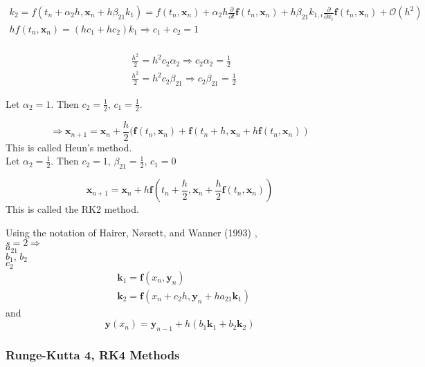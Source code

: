 \documentclass[10pt]{amsart}
\begin{document}
\begin{multicols*}{2}
\[
\begin{gathered}
k_2 = f(t_n+\alpha_2 h, \mathbf{x}_n + h\beta_{21} k_1) = f(t_n,\mathbf{x}_n) + \alpha_2 h \frac{\partial}{\partial t} \mathbf{f}(t_n,\mathbf{x}_n) + h \beta_{21} k_{1, i} \frac{\partial}{\partial x_i} \mathbf{f}(t_n, \mathbf{x}_n) + \mathcal{O}(h^2)	 \\
hf(t_n,\mathbf{x}_n) = (hc_1 + hc_2) k_1 \Longrightarrow c_1 + c_2 = 1 \\
\end{gathered}
\]

\[
\begin{aligned}
	& \frac{h^2}{2} = h^2 c_2 \alpha_2 \Longrightarrow c_2\alpha_2 = \frac{1}{2} \\
 	& \frac{h^2}{2} = h^2 c_2 \beta_{21} \Longrightarrow c_2 \beta_{21} = \frac{1}{2}
\end{aligned}
\]

Let $\alpha_2 = 1$. Then $c_2 = \frac{1}{2}$, $c_1= \frac{1}{2}$.

\[
\Longrightarrow \mathbf{x}_{n+1} = \mathbf{x}_n + \frac{h}{2} (\mathbf{f}(t_n, \mathbf{x}_n ) + \mathbf{f}(t_n + h, \mathbf{x}_n + h\mathbf{f}(t_n, \mathbf{x}_n))
\]
This is called Heun's method. \\

Let $\alpha_2 = \frac{1}{2}$. Then $c_2 = 1, \, \beta_{21} = \frac{1}{2}, \, c_1 = 0$

\[
\mathbf{x}_{n+1} = \mathbf{x}_n + h \mathbf{f}(t_n + \frac{h}{2}, \mathbf{x}_n + \frac{h}{2} \mathbf{f}(t_n, \mathbf{x}_n))
\]
This is called the RK2 method.

Using the notation of Hairer, N\o rsett, and Wanner (1993) \cite{HNW1993}, \\
$s=2 \Longrightarrow$ \\
$a_{21}$ \\
$b_1, \, b_2$ \\
$c_2$ \\

\[
\begin{aligned}
	& \mathbf{k}_1 = \mathbf{f}(x_n, \mathbf{y}_n) \\
	& \mathbf{k}_2 = \mathbf{f}(x_n + c_2h, \mathbf{y}_n + ha_{21} \mathbf{k}_1) 	
\end{aligned}
\]
and 
\[
\mathbf{y}(x_n) = \mathbf{y}_{n-1} + h(b_1 \mathbf{k}_1 + b_2 \mathbf{k}_2)
\]


\subsubsection{Runge-Kutta 4, RK4 Methods}


\end{multicols*}
\end{document}
